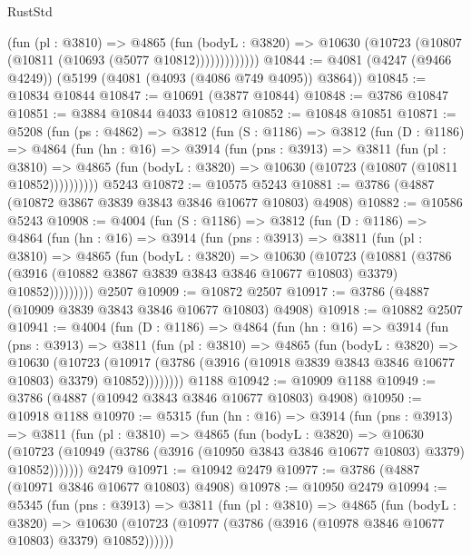 \begin{lexlean}{RustStd}
\begin{coremodule}
                (fun (pl : @3810) =>
                @4865
                  (fun (bodyL : @3820) =>
                  @10630 (@10723 (@10807 (@10811 (@10693 (@5077 @10812)))))))))))))
@10844 := @4081 (@4247 (@9466 @4249)) (@5199 (@4081 (@4093 (@4086 @749 @4095)) @3864))
@10845 := @10834 @10844
@10847 := @10691 (@3877 @10844)
@10848 := @3786 @10847
@10851 := @3884 @10844 @4033 @10812
@10852 := @10848 @10851
@10871 := @5208
    (fun (ps : @4862) =>
    @3812
      (fun (S : @1186) =>
      @3812
        (fun (D : @1186) =>
        @4864
          (fun (hn : @16) =>
          @3914
            (fun (pns : @3913) =>
            @3811
              (fun (pl : @3810) =>
              @4865 (fun (bodyL : @3820) => @10630 (@10723 (@10807 (@10811 @10852))))))))))
    @5243
@10872 := @10575 @5243
@10881 := @3786 (@4887 (@10872 @3867 @3839 @3843 @3846 @10677 @10803) @4908)
@10882 := @10586 @5243
@10908 := @4004
    (fun (S : @1186) =>
    @3812
      (fun (D : @1186) =>
      @4864
        (fun (hn : @16) =>
        @3914
          (fun (pns : @3913) =>
          @3811
            (fun (pl : @3810) =>
            @4865
              (fun (bodyL : @3820) =>
              @10630
                (@10723
                  (@10881
                    (@3786
                      (@3916 (@10882 @3867 @3839 @3843 @3846 @10677 @10803) @3379)
                      @10852)))))))))
    @2507
@10909 := @10872 @2507
@10917 := @3786 (@4887 (@10909 @3839 @3843 @3846 @10677 @10803) @4908)
@10918 := @10882 @2507
@10941 := @4004
    (fun (D : @1186) =>
    @4864
      (fun (hn : @16) =>
      @3914
        (fun (pns : @3913) =>
        @3811
          (fun (pl : @3810) =>
          @4865
            (fun (bodyL : @3820) =>
            @10630
              (@10723
                (@10917 (@3786 (@3916 (@10918 @3839 @3843 @3846 @10677 @10803) @3379) @10852))))))))
    @1188
@10942 := @10909 @1188
@10949 := @3786 (@4887 (@10942 @3843 @3846 @10677 @10803) @4908)
@10950 := @10918 @1188
@10970 := @5315
    (fun (hn : @16) =>
    @3914
      (fun (pns : @3913) =>
      @3811
        (fun (pl : @3810) =>
        @4865
          (fun (bodyL : @3820) =>
          @10630
            (@10723 (@10949 (@3786 (@3916 (@10950 @3843 @3846 @10677 @10803) @3379) @10852)))))))
    @2479
@10971 := @10942 @2479
@10977 := @3786 (@4887 (@10971 @3846 @10677 @10803) @4908)
@10978 := @10950 @2479
@10994 := @5345
    (fun (pns : @3913) =>
    @3811
      (fun (pl : @3810) =>
      @4865
        (fun (bodyL : @3820) =>
        @10630 (@10723 (@10977 (@3786 (@3916 (@10978 @3846 @10677 @10803) @3379) @10852))))))

\end{coremodule}
\end{lexlean}
